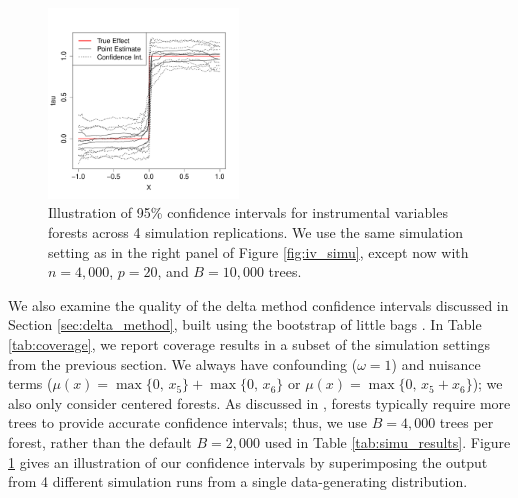 \documentclass[aos]{imsart}
\theoremstyle{plain}
\theoremstyle{definition}
\theoremstyle{remark}
\newcommand{\FIGW}{0.45}
\begin{document}
\begin{CJK}{UTF8}{gbsn}
{\begin{appendix}
\begin{figure}
\includegraphics[width=\FIGW\textwidth]{IV_plot_with_CI.pdf}
\caption{Illustration of 95\% confidence intervals for instrumental variables forests across 4 simulation replications.
We use the same simulation setting as in the right panel of Figure \ref{fig:iv_simu},
except now with $n = 4,000$, $p = 20$, and $B = 10,000$ trees.}
\label{fig:ci_picture}
\vspace{-1.5\baselineskip}
\end{figure}

We also examine the quality of the delta method confidence intervals discussed in
Section \ref{sec:delta_method}, built using the bootstrap of little bags \citep{sexton2009standard}.
In Table \ref{tab:coverage}, we report coverage results in a subset of the simulation settings from the previous
section. We always have confounding ($\omega = 1$) and nuisance terms
($\mu(x) = \max\{0, \, x_5\} + \max\{0, \, x_6\}$ or $\mu(x) = \max\{0, \, x_5 + x_6\}$);
we also only consider centered forests. As discussed in \citet{wager2014confidence}, forests
typically require more trees to provide accurate confidence intervals; thus, we use $B = 4,000$ trees
per forest, rather than the default $B = 2,000$ used in Table \ref{tab:simu_results}.
Figure \ref{fig:ci_picture} gives an illustration of our confidence intervals by superimposing
the output from 4 different simulation runs from a single data-generating distribution.


\end{appendix}}
\end{CJK}
\end{document}
